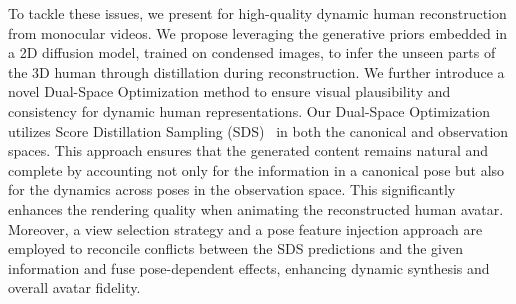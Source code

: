 
\IEEEpubidadjcol
To tackle these issues, we present \name for high-quality dynamic human reconstruction from monocular videos. We propose leveraging the generative priors embedded in a 2D diffusion model, trained on condensed images, to infer the unseen parts of the 3D human through distillation during reconstruction. We further introduce a novel Dual-Space Optimization method to ensure visual plausibility and consistency for dynamic human representations. 
Our Dual-Space Optimization utilizes Score Distillation Sampling (SDS)~\cite{poole2022dreamfusion} in both the canonical and observation spaces. This approach ensures that the generated content remains natural and complete by accounting not only for the information in a canonical pose but also for the dynamics across poses in the observation space. This significantly enhances the rendering quality when animating the reconstructed human avatar. Moreover, a view selection strategy and a pose feature injection approach are employed to reconcile conflicts between the SDS predictions and the given information and fuse pose-dependent effects, enhancing dynamic synthesis and overall avatar fidelity.

